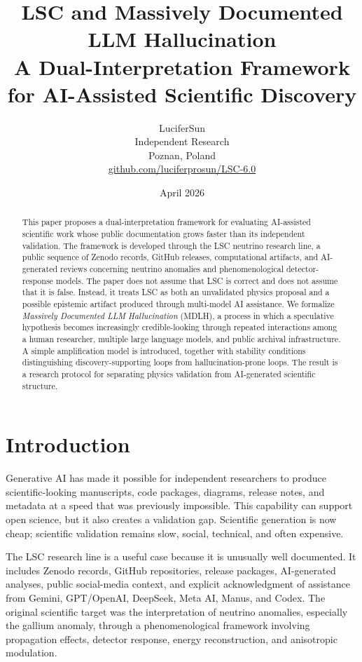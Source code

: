 \documentclass[11pt,a4paper]{article}
\title{\textbf{LSC and Massively Documented LLM Hallucination}\\
\large A Dual-Interpretation Framework for AI-Assisted Scientific Discovery}
\author{LuciferSun\\Independent Research\\Poznan, Poland\\\href{https://github.com/luciferprosun/LSC-6.0}{github.com/luciferprosun/LSC-6.0}}
\date{April 2026}
\begin{document}
\maketitle

\begin{abstract}
This paper proposes a dual-interpretation framework for evaluating AI-assisted scientific work whose public documentation grows faster than its independent validation. The framework is developed through the LSC neutrino research line, a public sequence of Zenodo records, GitHub releases, computational artifacts, and AI-generated reviews concerning neutrino anomalies and phenomenological detector-response models. The paper does not assume that LSC is correct and does not assume that it is false. Instead, it treats LSC as both an unvalidated physics proposal and a possible epistemic artifact produced through multi-model AI assistance. We formalize \emph{Massively Documented LLM Hallucination} (MDLH), a process in which a speculative hypothesis becomes increasingly credible-looking through repeated interactions among a human researcher, multiple large language models, and public archival infrastructure. A simple amplification model is introduced, together with stability conditions distinguishing discovery-supporting loops from hallucination-prone loops. The result is a research protocol for separating physics validation from AI-generated scientific structure.
\end{abstract}

\section{Introduction}

Generative AI has made it possible for independent researchers to produce scientific-looking manuscripts, code packages, diagrams, release notes, and metadata at a speed that was previously impossible. This capability can support open science, but it also creates a validation gap. Scientific generation is now cheap; scientific validation remains slow, social, technical, and often expensive.

The LSC research line is a useful case because it is unusually well documented. It includes Zenodo records, GitHub repositories, release packages, AI-generated analyses, public social-media context, and explicit acknowledgment of assistance from Gemini, GPT/OpenAI, DeepSeek, Meta AI, Manus, and Codex. The original scientific target was the interpretation of neutrino anomalies, especially the gallium anomaly, through a phenomenological framework involving propagation effects, detector response, energy reconstruction, and anisotropic modulation.
\end{document}
